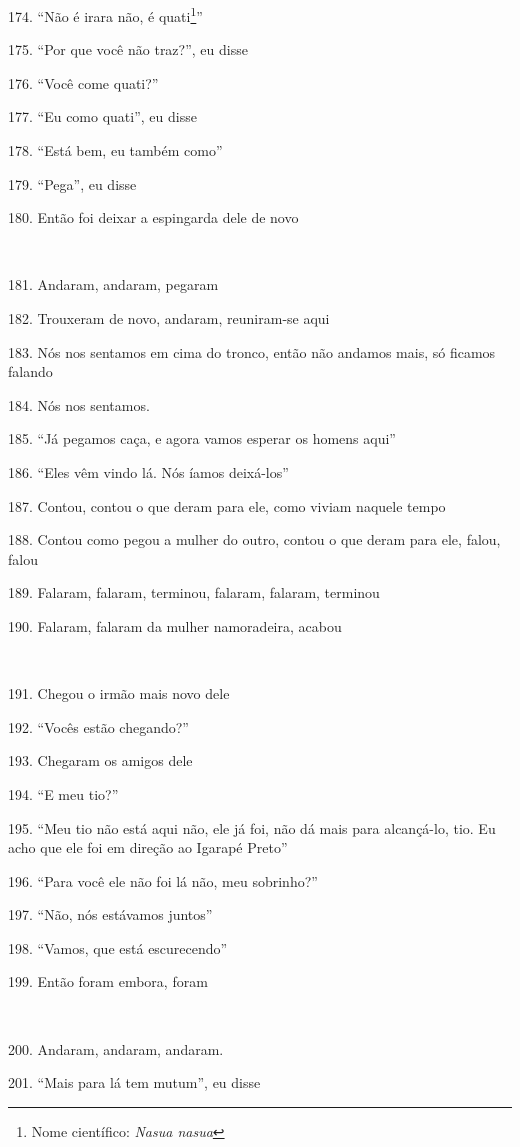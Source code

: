 174. ``Não é irara não, é quati\footnote{Nome científico: \emph{Nasua
  nasua}}''

175. ``Por que você não traz?'', eu disse

176. ``Você come quati?''

177. ``Eu como quati'', eu disse

178. ``Está bem, eu também como''

179. ``Pega'', eu disse

180. Então foi deixar a espingarda dele de novo

~

181. Andaram, andaram, pegaram

182. Trouxeram de novo, andaram, reuniram-se aqui

183. Nós nos sentamos em cima do tronco, então não andamos mais, só
ficamos falando

184. Nós nos sentamos.

185. ``Já pegamos caça, e agora vamos esperar os homens aqui''

186. ``Eles vêm vindo lá. Nós íamos deixá-los''

187. Contou, contou o que deram para ele, como viviam naquele tempo

188. Contou como pegou a mulher do outro, contou o que deram para ele,
falou, falou

189. Falaram, falaram, terminou, falaram, falaram, terminou

190. Falaram, falaram da mulher namoradeira, acabou

~

191. Chegou o irmão mais novo dele

192. ``Vocês estão chegando?''

193. Chegaram os amigos dele

194. ``E meu tio?''

195. ``Meu tio não está aqui não, ele já foi, não dá mais para
alcançá-lo, tio. Eu acho que ele foi em direção ao Igarapé Preto''

196. ``Para você ele não foi lá não, meu sobrinho?''

197. ``Não, nós estávamos juntos''

198. ``Vamos, que está escurecendo''

199. Então foram embora, foram

~

200. Andaram, andaram, andaram.

201. ``Mais para lá tem mutum'', eu disse

